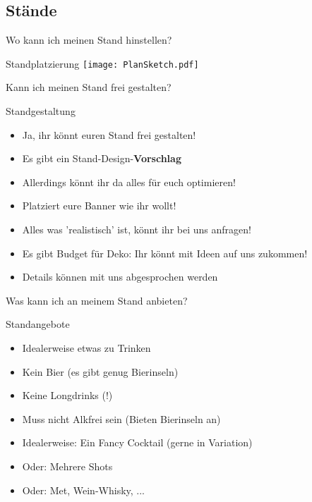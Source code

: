 \subsection{Stände}

\begin{frame}[standout]
    Wo kann ich meinen Stand hinstellen?
\end{frame}


\begin{frame}[c]{Standplatzierung}
    \texttt{[image: PlanSketch.pdf]} \\
\end{frame}



\begin{frame}[standout]
    Kann ich meinen Stand frei gestalten?
\end{frame}

\begin{frame}[c]{Standgestaltung}
    \begin{itemize}[<+(1)->]
        \item Ja, ihr könnt euren Stand frei gestalten!
        \item Es gibt ein Stand-Design-\textbf{Vorschlag}
        \item Allerdings könnt ihr da alles für euch optimieren!
        \item Platziert eure Banner wie ihr wollt!
        \item Alles was 'realistisch' ist, könnt ihr bei uns anfragen!
        \item Es gibt Budget für Deko: Ihr könnt mit Ideen auf uns zukommen!
        \item Details können mit uns abgesprochen werden
    \end{itemize}
\end{frame}


\begin{frame}[standout]
    Was kann ich an meinem Stand anbieten?
\end{frame}

\begin{frame}[c]{Standangebote}
    \begin{itemize}[<+(1)->]
        \item Idealerweise etwas zu Trinken
        \item Kein Bier (es gibt genug Bierinseln)
        \item Keine Longdrinks (!)
        \item Muss nicht Alkfrei sein (Bieten Bierinseln an)
        \item Idealerweise: Ein Fancy Cocktail (gerne in Variation)
        \item Oder: Mehrere Shots
        \item Oder: Met, Wein-Whisky, ...
    \end{itemize}
\end{frame}


